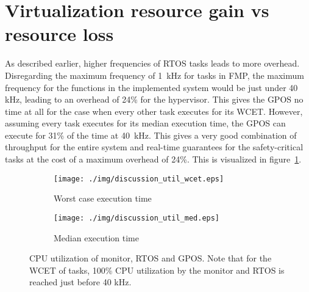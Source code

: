 
\section{Virtualization resource gain vs resource loss}
As described earlier, higher frequencies of RTOS tasks leads to more overhead. Disregarding the maximum frequency of 1~kHz for tasks in FMP, the maximum frequency for the functions in the implemented system would be just under 40 kHz, leading to an overhead of 24\% for the hypervisor. This gives the GPOS no time at all for the case when every other task executes for its WCET. However, assuming every task executes for its median execution time, the GPOS can execute for 31\% of the time at 40~kHz. This gives a very good combination of throughput for the entire system and real-time guarantees for the safety-critical tasks at the cost of a maximum overhead of 24\%. This is visualized in figure~\ref{fig:cpu_util}.

\begin{figure}[H]
\centering
\begin{subfigure}[b]{0.49\textwidth}
\texttt{[image: ./img/discussion\_util\_wcet.eps]}
\caption{Worst case execution time}
\end{subfigure}
\begin{subfigure}[b]{0.49\textwidth}
\texttt{[image: ./img/discussion\_util\_med.eps]}
\caption{Median execution time}
\end{subfigure}
\caption{CPU utilization of monitor, RTOS and GPOS. Note that for the WCET of tasks, 100\% CPU utilization by the monitor and RTOS is reached just before 40 kHz.}
\label{fig:cpu_util}
\end{figure}



